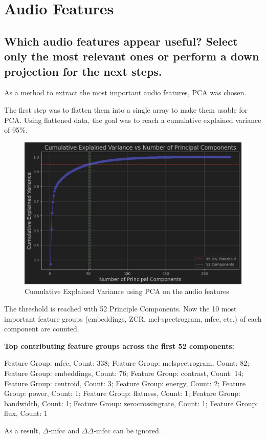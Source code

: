 
\section{Audio Features}
\label{sec:Audio Features}


\subsection{Which audio features appear useful? Select only the most relevant ones or perform a down projection for the next steps.}
\label{sec:Audio Features:a}

As a method to extract the most important audio features, PCA was chosen.

The first step was to flatten them into a single array to make them usable for PCA. Using flattened data, the goal was to reach a cumulative explained variance of 95\%.

\begin{figure}[htbp]
    \centering
    \includegraphics[width=0.5\linewidth]{figs/Cumulative Explained Variance.png}
    \caption{Cumulative Explained Variance using PCA on the audio features}
    \label{fig:Cumulative Explained Variance}
\end{figure}

The threshold is reached with 52 Principle Components. Now the 10 most important feature groups (embeddings, ZCR, mel-spectrogram, mfcc, etc.) of each component are counted. 

\textbf{Top contributing feature groups across the first 52 components:}

Feature Group: mfcc, Count: 338;
Feature Group: melspectrogram, Count: 82;
Feature Group: embeddings, Count: 76;
Feature Group: contrast, Count: 14;
Feature Group: centroid, Count: 3;
Feature Group: energy, Count: 2;
Feature Group: power, Count: 1;
Feature Group: flatness, Count: 1;
Feature Group: bandwidth, Count: 1;
Feature Group: zerocrossingrate, Count: 1;
Feature Group: flux, Count: 1

As a result, $\Delta$-mfcc and $\Delta\Delta$-mfcc can be ignored.


